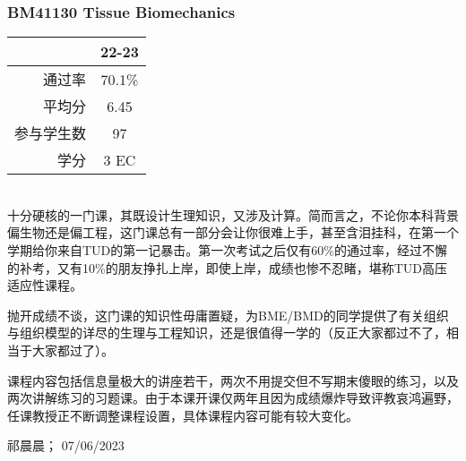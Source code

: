 \subsubsection{BM41130 Tissue Biomechanics}
\begin{minipage}{0.45\textwidth}
\centering
{}
\end{minipage}%
\begin{minipage}{0.45\textwidth}
\raggedleft
\begin{tabular}{r|c}
\textbf{ } & \textbf{22-23} \\ \hline
通过率 & 70.1\% \\ 
平均分 & 6.45 \\ 
参与学生数 & 97 \\
学分 & 3 EC\\
\end{tabular}
\end{minipage}\\

十分硬核的一门课，其既设计生理知识，又涉及计算。简而言之，不论你本科背景偏生物还是偏工程，这门课总有一部分会让你很难上手，甚至含泪挂科，在第一个学期给你来自TUD的第一记暴击。第一次考试之后仅有60\%的通过率，经过不懈的补考，又有10\%的朋友挣扎上岸，即使上岸，成绩也惨不忍睹，堪称TUD高压适应性课程。

抛开成绩不谈，这门课的知识性毋庸置疑，为BME/BMD的同学提供了有关组织与组织模型的详尽的生理与工程知识，还是很值得一学的（反正大家都过不了，相当于大家都过了）。

课程内容包括信息量极大的讲座若干，两次不用提交但不写期末傻眼的练习，以及两次讲解练习的习题课。由于本课开课仅两年且因为成绩爆炸导致评教哀鸿遍野，任课教授正不断调整课程设置，具体课程内容可能有较大变化。
\begin{flushright}
祁晨晨； 07/06/2023
\end{flushright}